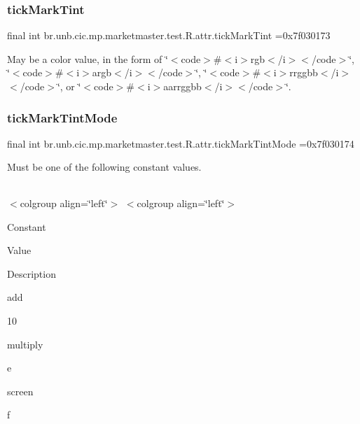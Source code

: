 \subsubsection{\texorpdfstring{tick\+Mark\+Tint}{tickMarkTint}}
{\footnotesize\ttfamily final int br.\+unb.\+cic.\+mp.\+marketmaster.\+test.\+R.\+attr.\+tick\+Mark\+Tint =0x7f030173\hspace{0.3cm}{\ttfamily [static]}}

May be a color value, in the form of \char`\"{}$<$code$>$\#$<$i$>$rgb$<$/i$>$$<$/code$>$\char`\"{}, \char`\"{}$<$code$>$\#$<$i$>$argb$<$/i$>$$<$/code$>$\char`\"{}, \char`\"{}$<$code$>$\#$<$i$>$rrggbb$<$/i$>$$<$/code$>$\char`\"{}, or \char`\"{}$<$code$>$\#$<$i$>$aarrggbb$<$/i$>$$<$/code$>$\char`\"{}. \mbox{\label{classbr_1_1unb_1_1cic_1_1mp_1_1marketmaster_1_1test_1_1R_1_1attr_a34482b87569280edad71fe283789754b}} 
\subsubsection{\texorpdfstring{tick\+Mark\+Tint\+Mode}{tickMarkTintMode}}
{\footnotesize\ttfamily final int br.\+unb.\+cic.\+mp.\+marketmaster.\+test.\+R.\+attr.\+tick\+Mark\+Tint\+Mode =0x7f030174\hspace{0.3cm}{\ttfamily [static]}}

Must be one of the following constant values.

\tabulinesep=1mm
\begin{longtabu} spread 0pt [c]{*{0}{|X[-1]}|}
\hline
\end{longtabu}
$<$colgroup align=\char`\"{}left\char`\"{}$>$ $<$colgroup align=\char`\"{}left\char`\"{}$>$ 

Constant

Value

Description 

add

10

multiply

e

screen

f

